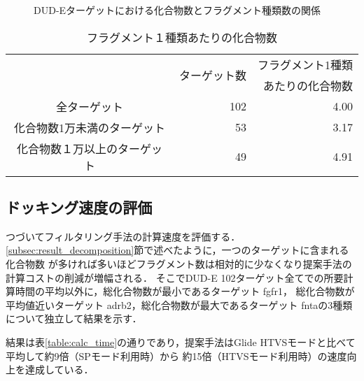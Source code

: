 \begin{figure}[bhtp]
 \begin{center}
  \caption{DUD-Eターゲットにおける化合物数とフラグメント種類数の関係}
  \label{fig:dude_decomposition}
 \end{center}
\end{figure}
\begin{table}[htb] \centering
	\caption{フラグメント１種類あたりの化合物数}
	\label{table:dude_decomposition}
	\begin{tabular}{c|rr}
	\hline
								&\multirow{2}{*}{ターゲット数}	&フラグメント1種類		\\
								&						&あたりの化合物数		\\ \hline
	全ターゲット					&102		&4.00							\\
	化合物数1万未満のターゲット		&53			&3.17							\\
	化合物数１万以上のターゲット	&49			&4.91							\\ \hline
	\end{tabular}
\end{table}


\subsection{ドッキング速度の評価}\label{subsec:single_calc_time}
つづいてフィルタリング手法の計算速度を評価する．\ref{subsec:result_decomposition}節で述べたように，一つのターゲットに含まれる化合物数
が多ければ多いほどフラグメント数は相対的に少なくなり提案手法の計算コストの削減が増幅される．
そこでDUD-E 102ターゲット全てでの所要計算時間の平均以外に，総化合物数が最小であるターゲット fgfr1，
総化合物数が平均値近いターゲット adrb2，総化合物数が最大であるターゲット fntaの3種類について独立して結果を示す．

結果は表\ref{table:calc_time}の通りであり，提案手法はGlide HTVSモードと比べて平均して約9倍（SPモード利用時）から
約15倍（HTVSモード利用時）の速度向上を達成している．

